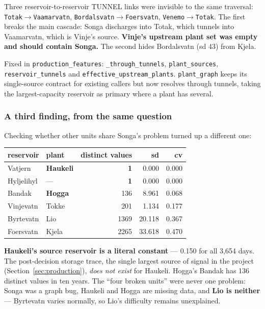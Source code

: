 \begin{finding}
Three reservoir-to-reservoir TUNNEL links were invisible to the same traversal:
\texttt{Totak}$\to$\texttt{Vaamarvatn}, \texttt{Bordalsvatn}$\to$\texttt{Foersvatn},
\texttt{Venemo}$\to$\texttt{Totak}. The first breaks the main cascade: Songa discharges into
Totak, which tunnels into Vaamarvatn, which is Vinje's source. \textbf{Vinje's upstream plant set
was empty and should contain Songa.} The second hides Bordalsvatn (sd 43) from Kjela.
\end{finding}

Fixed in \texttt{production\_features}: \texttt{\_through\_tunnels}, \texttt{plant\_sources},
\texttt{reservoir\_tunnels} and \texttt{effective\_upstream\_plants}. \texttt{plant\_graph} keeps
its single-source contract for existing callers but now resolves through tunnels, taking the
largest-capacity reservoir as primary where a plant has several.

\subsubsection*{A third finding, from the same question}

Checking whether other units share Songa's problem turned up a different one:

\begin{center}\small
\begin{tabular}{llrrr}
\toprule
reservoir & plant & distinct values & sd & cv \\
\midrule
Vatjern     & \textbf{Haukeli} & \textbf{1} & 0.000 & 0.000 \\
Hyljelihyl  & ---              & \textbf{1} & 0.000 & 0.000 \\
Bandak      & \textbf{Hogga}   & 136        & 8.961 & 0.068 \\
Vinjevatn   & Tokke            & 201        & 1.134 & 0.177 \\
Byrtevatn   & Lio              & 1369       & 20.118 & 0.367 \\
Foersvatn   & Kjela            & 2265       & 33.618 & 0.470 \\
\bottomrule
\end{tabular}
\end{center}

\begin{finding}
\textbf{Haukeli's source reservoir is a literal constant} --- 0.150 for all 3{,}654 days. The
post-decision storage trace, the single largest source of signal in the project
(Section~\ref{sec:production}), \emph{does not exist} for Haukeli. Hogga's Bandak has 136 distinct
values in ten years. The ``four broken units'' were never one problem: Songa was a graph bug,
Haukeli and Hogga are missing data, and \textbf{Lio is neither} --- Byrtevatn varies normally, so
Lio's difficulty remains unexplained.
\end{finding}

